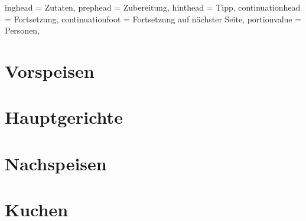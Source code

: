 \documentclass[%
a4paper,
twoside,
11pt
]{article}
\begin{document}
\begin{otherlanguage}{ngerman}
\setHeadlines
{%
    inghead = Zutaten,
    prephead = Zubereitung,
    hinthead = Tipp,
    continuationhead = Fortsetzung,
    continuationfoot = Fortsetzung auf n\"achster Seite,
    portionvalue = Personen,
}

\section{Vorspeisen}

\section{Hauptgerichte}













\section{Nachspeisen}

\section{Kuchen}

\end{otherlanguage}
\end{document}
